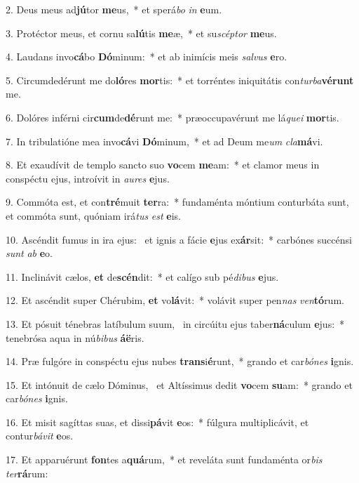 2. Deus meus ad\textbf{jú}tor \textbf{me}us,~*  et sperá\textit{bo} \textit{in} \textbf{e}um.\

3. Protéctor meus, et cornu sa\textbf{lú}tis \textbf{me}æ,~*  et su\textit{scép}\textit{tor} \textbf{me}us.\

4. Laudans invo\textbf{cá}bo \textbf{Dó}minum:~*  et ab inimícis meis \textit{sal}\textit{vus} \textbf{e}ro.\

5. Circumdedérunt me do\textbf{ló}res \textbf{mor}tis:~*  et torréntes iniquitátis con\textit{tur}\textit{ba}\textbf{vé}\textbf{runt} me.\

6. Dolóres inférni cir\textbf{cum}de\textbf{dé}runt me:~*  præoccupavérunt me lá\textit{que}\textit{i} \textbf{mor}tis.\

7. In tribulatióne mea invo\textbf{cá}vi \textbf{Dó}minum,~*  et ad Deum me\textit{um} \textit{cla}\textbf{má}vi.\

8. Et exaudívit de templo sancto suo \textbf{vo}cem \textbf{me}am:~*  et clamor meus in conspéctu ejus, introívit in \textit{au}\textit{res} \textbf{e}jus.\

9. Commóta est, et con\textbf{tré}muit \textbf{ter}ra:~*  fundaménta móntium conturbáta sunt, et commóta sunt, quóniam irá\textit{tus} \textit{est} \textbf{e}is.\

10. Ascéndit fumus in ira ejus: \dag\  et ignis a fácie \textbf{e}jus ex\textbf{ár}sit:~*  carbónes succénsi \textit{sunt} \textit{ab} \textbf{e}o.\

11. Inclinávit cælos, \textbf{et} de\textbf{scén}dit:~*  et calígo sub pé\textit{di}\textit{bus} \textbf{e}jus.\

12. Et ascéndit super Chérubim, \textbf{et} vo\textbf{lá}vit:~*  volávit super pen\textit{nas} \textit{ven}\textbf{tó}rum.\

13. Et pósuit ténebras latíbulum suum, \dag\  in circúitu ejus taber\textbf{ná}culum \textbf{e}jus:~*  tenebrósa aqua in nú\textit{bi}\textit{bus} \textbf{á}\textbf{ë}ris.\

14. Præ fulgóre in conspéctu ejus nubes \textbf{trans}i\textbf{é}runt,~*  grando et car\textit{bó}\textit{nes} \textbf{i}gnis.\

15. Et intónuit de cælo Dóminus, \dag\  et Altíssimus dedit \textbf{vo}cem \textbf{su}am:~*  grando et car\textit{bó}\textit{nes} \textbf{i}gnis.\

16. Et misit sagíttas suas, et dissi\textbf{pá}vit \textbf{e}os:~*  fúlgura multiplicávit, et contur\textit{bá}\textit{vit} \textbf{e}os.\

17. Et apparuérunt \textbf{fon}tes a\textbf{quá}rum,~*  et reveláta sunt fundaménta or\textit{bis} \textit{ter}\textbf{rá}rum:\

